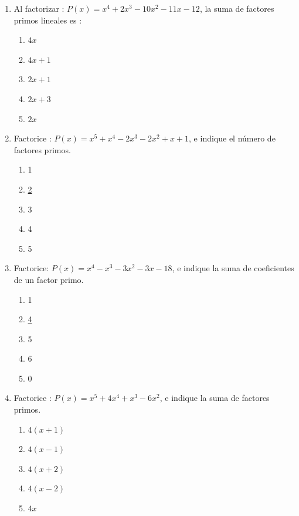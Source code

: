 \documentclass{article}
\begin{document}
\begin{enumerate}
\item{Al factorizar : $P(x) = x^4 + 2x^3 - 10x^2 - 11x - 12$, la suma de factores primos lineales es :
\begin{enumerate}
\item{$4x$}
\item{$4x + 1$}
\item{\underline{$2x + 1$}}
\item{$2x + 3$}
\item{$2x$}
\end{enumerate}
}

\item{Factorice : $P(x) = x^5 + x^4 - 2x^3 - 2x^2 + x + 1$, e indique el n\'umero de factores primos.
\begin{enumerate}
\item{1}
\item{\underline{2}}
\item{3}
\item{4}
\item{5}
\end{enumerate}
}

\item{Factorice: $P(x) = x^4 -x^3 - 3x^2 - 3x -18$, e indique la suma de coeficientes de un factor primo.
\begin{enumerate}
\item{1}
\item{\underline{4}}
\item{5}
\item{6}
\item{0}
\end{enumerate}
}

\item{Factorice : $P(x) = x^5 + 4x^4 + x^3 - 6x^2$, e indique la suma de factores primos.
\begin{enumerate}
\item{\underline{$4(x + 1)$}}
\item{$4(x - 1)$}
\item{$4(x + 2)$}
\item{$4(x - 2)$}
\item{$4x$}
\end{enumerate}
}

\end{enumerate}
\end{document}
